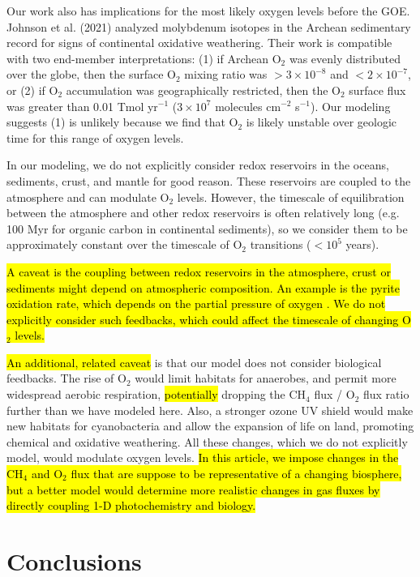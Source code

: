 \documentclass[9pt,twocolumn,twoside,lineno]{pnas-new}
\begin{document}
Our work also has implications for the most likely oxygen levels before the GOE. Johnson et al. (2021) \cite{Johnson_2021} analyzed molybdenum isotopes in the Archean sedimentary record for signs of continental oxidative weathering. Their work is compatible with two end-member interpretations: (1) if Archean O$_2$ was evenly distributed over the globe, then the surface O$_2$ mixing ratio was $> 3 \times 10^{-8}$ and $< 2 \times 10^{-7}$, or (2) if O$_2$ accumulation was geographically restricted, then the O$_2$ surface flux was greater than 0.01 Tmol yr$^{-1}$ ($3 \times 10^{7}$ molecules cm$^{-2}$ s$^{-1}$). Our modeling suggests (1) is unlikely because we find that O$_2$ is likely unstable over geologic time for this range of oxygen levels.

In our modeling, we do not explicitly consider redox reservoirs in the oceans, sediments, crust, and mantle for good reason. These reservoirs are coupled to the atmosphere and can modulate O$_2$ levels. However, the timescale of equilibration between the atmosphere and other redox reservoirs is often relatively long (e.g. 100 Myr for organic carbon in continental sediments), so we consider them to be approximately constant over the timescale of O$_2$ transitions ($<10^5$ years).

\hl{A caveat is the coupling between redox reservoirs in the atmosphere, crust or sediments might depend on atmospheric composition. An example is the pyrite oxidation rate, which depends on the partial pressure of oxygen \mbox{\cite{Bethan_2021}}. We do not explicitly consider such feedbacks, which could affect the timescale of changing O$_2$ levels.}

\hl{An additional, related caveat} is that our model does not consider biological feedbacks. The rise of O$_2$ would limit habitats for anaerobes, and permit more widespread aerobic respiration, \hl{potentially} dropping the CH$_4$ flux / O$_2$ flux ratio further than we have modeled here. Also, a stronger ozone UV shield would make new habitats for cyanobacteria and allow the expansion of life on land, promoting chemical and oxidative weathering. All these changes, which we do not explicitly model, would modulate oxygen levels. \hl{In this article, we impose changes in the CH$_4$ and O$_2$ flux that are suppose to be representative of a changing biosphere, but a better model would determine more realistic changes in gas fluxes by directly coupling 1-D photochemistry and biology.}

\section*{Conclusions}
\end{document}
